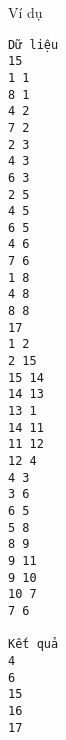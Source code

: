 Ví dụ  
\begin{verbatim}
Dữ liệu
15
1 1
8 1
4 2
7 2
2 3
4 3
6 3
2 5
4 5
6 5
4 6
7 6
1 8
4 8
8 8
17
1 2
2 15
15 14
14 13
13 1
14 11
11 12
12 4
4 3
3 6
6 5
5 8
8 9
9 11
9 10
10 7
7 6

Kết quả
4
6
15
16
17
\end{verbatim}